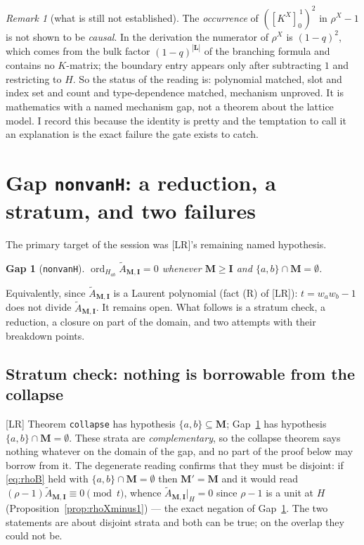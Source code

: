\documentclass[11pt]{article}
\theoremstyle{plain}
\theoremstyle{definition}
\theoremstyle{remark}
\newtheorem{rem}[thm]{Remark}
\theoremstyle{plain}
\newtheorem{gapthm}{Gap}
\newcommand{\bI}{\mathbf{I}}
\newcommand{\bM}{\mathbf{M}}
\newcommand{\bL}{\mathbf{L}}
\newcommand{\At}{\widetilde{A}}
\newcommand{\ord}{\operatorname{ord}}
\begin{document}
\begin{rem}[what is still not established]\label{rem:coord3}
The \emph{occurrence} of $([K^X]_0^{\,1})^2$ in $\rho^X-1$ is not shown to be
\emph{causal}.  In the derivation the numerator of $\rho^X$ is $(1-q)^2$, which
comes from the bulk factor $(1-q)^{|\bL|}$ of the branching formula and contains
no $K$-matrix; the boundary entry appears only after subtracting $1$ and
restricting to $H$.  So the status of the reading is: polynomial matched, slot
and index set and count and type-dependence matched, mechanism unproved.  It is
mathematics with a named mechanism gap, not a theorem about the lattice model.
I record this because the identity is pretty and the temptation to call it an
explanation is the exact failure the gate exists to catch.
\end{rem}

\section{Gap \texttt{nonvanH}: a reduction, a stratum, and two failures}
\label{sec:nonvanH}

The primary target of the session was [LR]'s remaining named hypothesis.

\begin{gapthm}[\texttt{nonvanH}]\label{gap:nonvanH}
$\ord_{H_{ab}}\At_{\bM,\bI}=0$ whenever $\bM\ge\bI$ and
$\{a,b\}\cap\bM=\emptyset$.
\end{gapthm}

Equivalently, since $\At_{\bM,\bI}$ is a Laurent polynomial (fact (R) of [LR]):
$t=w_aw_b-1$ does not divide $\At_{\bM,\bI}$.  It remains open.  What follows is
a stratum check, a reduction, a closure on part of the domain, and two attempts
with their breakdown points.

\subsection{Stratum check: nothing is borrowable from the collapse}
\label{sec:strat}

[LR] Theorem \texttt{collapse} has hypothesis $\{a,b\}\subseteq\bM$;
Gap~\ref{gap:nonvanH} has hypothesis $\{a,b\}\cap\bM=\emptyset$.  These strata
are \emph{complementary}, so the collapse theorem says nothing whatever on the
domain of the gap, and no part of the proof below may borrow from it.  The
degenerate reading confirms that they must be disjoint: if \eqref{eq:rhoB} held
with $\{a,b\}\cap\bM=\emptyset$ then $\bM'=\bM$ and it would read
$(\rho-1)\At_{\bM,\bI}\equiv0\pmod t$, whence $\At_{\bM,\bI}|_H=0$ since
$\rho-1$ is a unit at $H$ (Proposition~\ref{prop:rhoXminus1}) --- the exact
negation of Gap~\ref{gap:nonvanH}.  The two statements are about disjoint strata
and both can be true; on the overlap they could not be.
\end{document}
